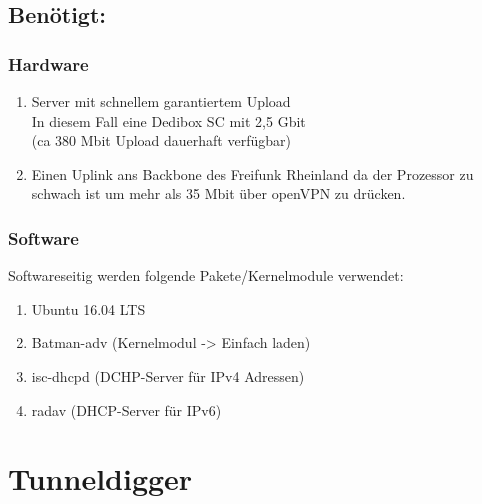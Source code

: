 \subsection{Benötigt:}
\subsubsection{Hardware}
  \begin{enumerate}
    \item Server mit schnellem garantiertem Upload\\
          In diesem Fall eine Dedibox SC mit 2,5 Gbit \\
          (ca 380 Mbit Upload dauerhaft verfügbar)
    \item Einen Uplink ans Backbone des Freifunk Rheinland da der Prozessor zu schwach ist um mehr als 35 Mbit über openVPN zu drücken.  
  \end{enumerate}

\subsubsection{Software}
Softwareseitig werden folgende Pakete/Kernelmodule verwendet:
\begin{enumerate} 
   \item  Ubuntu 16.04 LTS 
   \item  Batman-adv (Kernelmodul -> Einfach laden)
   \item  isc-dhcpd (DCHP-Server für IPv4 Adressen)
   \item  radav (DHCP-Server für IPv6)
\end{enumerate}



\section{Tunneldigger}
